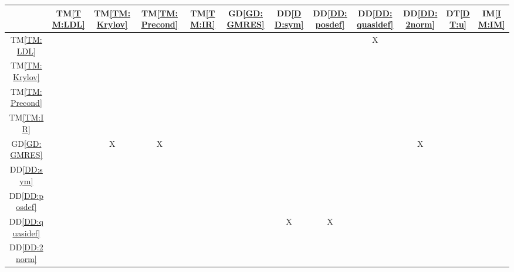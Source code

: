 \documentclass[12pt]{article}
\newcommand{\dref}[1]{GD\ref{#1}}
\newcommand{\ddref}[1]{DD\ref{#1}}
\newcommand{\dtref}[1]{DT\ref{#1}}
\newcommand{\tref}[1]{TM\ref{#1}}
\newcommand{\iref}[1]{IM\ref{#1}}
\begin{document}
\begin{table}[H]
  \centering
  \begin{tabular}{|c|c|c|c|c|c|c|c|c|c|c|c|} \hline
                        & \tref{TM:LDL} & \tref{TM:Krylov} & \tref{TM:Precond} & \tref{TM:IR} & \dref{GD:GMRES} & \ddref{DD:sym} & \ddref{DD:posdef} & \ddref{DD:quasidef} & \ddref{DD:2norm} & \dtref{DT:u} & \iref{IM:IM} \\ \hline
    \tref{TM:LDL}       &               &                  &                   &              &                 &                &                   & X                   &                  &              &              \\ \hline
    \tref{TM:Krylov}    &               &                  &                   &              &                 &                &                   &                     &                  &              &              \\ \hline
    \tref{TM:Precond}   &               &                  &                   &              &                 &                &                   &                     &                  &              &              \\ \hline
    \tref{TM:IR}        &               &                  &                   &              &                 &                &                   &                     &                  &              &              \\ \hline
    \dref{GD:GMRES}     &               & X                & X                 &              &                 &                &                   &                     & X                &              &              \\ \hline
    \ddref{DD:sym}      &               &                  &                   &              &                 &                &                   &                     &                  &              &              \\ \hline
    \ddref{DD:posdef}   &               &                  &                   &              &                 &                &                   &                     &                  &              &              \\ \hline
    \ddref{DD:quasidef} &               &                  &                   &              &                 & X              & X                 &                     &                  &              &              \\ \hline
    \ddref{DD:2norm}    &               &                  &                   &              &                 &                &                   &                     &                  &              &              \\ \hline

\end{tabular}
\end{table}
\end{document}
